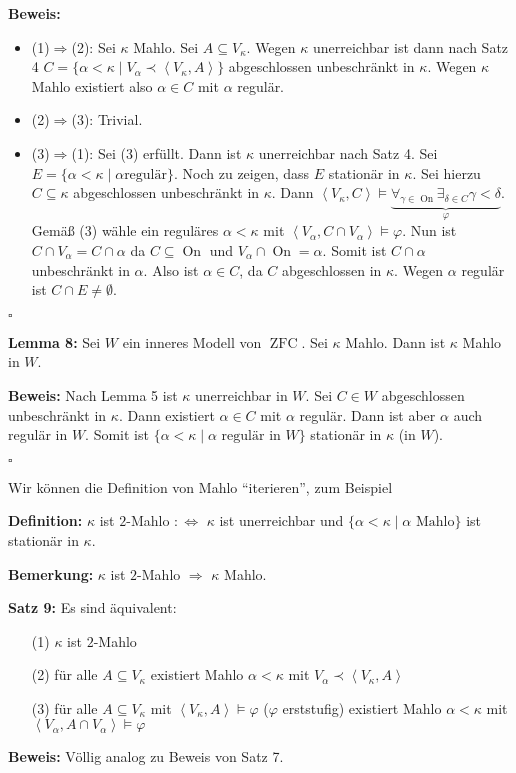 \documentclass[a4paper,fontsize=11pt]{scrartcl}
\newcommand{\ZFC}{\operatorname{ZFC}}
\newcommand{\On}{\operatorname{On}}
\begin{document}
{\bf Beweis:}
\begin{itemize}
\item (1)$\Rightarrow$(2): Sei $\kappa$ Mahlo. Sei $A\subseteq
  V_\kappa$. Wegen $\kappa$ unerreichbar ist dann nach Satz 4
  $C=\{\alpha<\kappa\mid V_\alpha\prec\left<V_\kappa,A\right>\}$
    abgeschlossen unbeschränkt in $\kappa$. Wegen $\kappa$ Mahlo
    existiert also $\alpha\in C$ mit $\alpha$ regulär.
\item (2)$\Rightarrow$(3): Trivial.
\item (3)$\Rightarrow$(1): Sei (3) erfüllt. Dann ist $\kappa$
  unerreichbar nach Satz 4. Sei $E=\{\alpha<\kappa\mid \alpha\mbox{
    regulär}\}$. Noch zu zeigen, dass $E$ stationär in $\kappa$. Sei
  hierzu $C\subseteq\kappa$ abgeschlossen unbeschränkt in
  $\kappa$. Dann
  $\left<V_\kappa,C\right>\models\underbrace{\forall_{\gamma\in\On}\exists_{\delta\in
      C}\gamma<\delta}_\varphi$. Gemäß (3) wähle ein reguläres
  $\alpha<\kappa$ mit $\left<V_\alpha,C\cap
  V_\alpha\right>\models\varphi$. Nun ist $C\cap V_\alpha=C\cap\alpha$
  da $C\subseteq\On$ und $V_\alpha\cap\On=\alpha$. Somit ist
  $C\cap\alpha$ unbeschränkt in $\alpha$. Also ist $\alpha\in C$, da
  $C$ abgeschlossen in $\kappa$. Wegen $\alpha$ regulär ist $C\cap
  E\neq\emptyset$.
\end{itemize}
\hfill $\square$

{\bf Lemma 8:} Sei $W$ ein inneres Modell von $\ZFC$. Sei $\kappa$
Mahlo. Dann ist $\kappa$ Mahlo in $W$.

{\bf Beweis:} Nach Lemma 5 ist $\kappa$ unerreichbar in $W$. Sei $C\in
W$ abgeschlossen unbeschränkt in $\kappa$. Dann existiert $\alpha\in
C$ mit $\alpha$ regulär. Dann ist aber $\alpha$ auch regulär in
$W$. Somit ist $\{\alpha<\kappa\mid \alpha\mbox{ regulär in }W\}$
stationär in $\kappa$ (in $W$).

\hfill $\square$

Wir können die Definition von Mahlo ``iterieren'', zum Beispiel

{\bf Definition:} $\kappa$ ist $2$-Mahlo $:\Leftrightarrow$ $\kappa$
ist unerreichbar und $\{\alpha<\kappa\mid \alpha\mbox{ Mahlo}\}$ ist
stationär in $\kappa$.

{\bf Bemerkung:} $\kappa$ ist $2$-Mahlo $\Rightarrow$ $\kappa$ Mahlo.

{\bf Satz 9:} Es sind äquivalent:
\begin{itemize}
\item[(1)] $\kappa$ ist $2$-Mahlo
\item[(2)] für alle $A\subseteq V_\kappa$ existiert Mahlo
  $\alpha<\kappa$ mit $V_\alpha\prec\left<V_\kappa,A\right>$
\item[(3)] für alle $A\subseteq V_\kappa$ mit
  $\left<V_\kappa,A\right>\models\varphi$ ($\varphi$ erststufig)
  existiert Mahlo $\alpha<\kappa$ mit $\left<V_\alpha,A\cap
  V_\alpha\right>\models\varphi$
\end{itemize}
{\bf Beweis:} Völlig analog zu Beweis von Satz 7.
\end{document}
